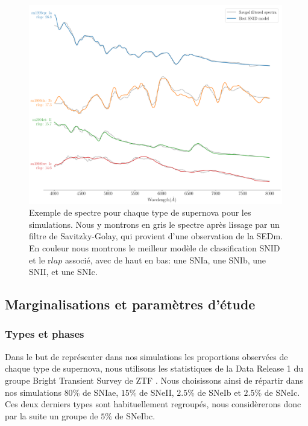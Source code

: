 \documentclass[../main/main.tex]{subfiles}
\begin{document}
\begin{figure}[ht]
  \centering
  \includegraphics[width=0.99\textwidth]{../figures/08_simu/specsimueach.pdf}
  \caption[Exemple de spectre pour chaque type de supernova pour les
  simulations.]{Exemple de spectre pour chaque type de supernova pour
    les simulations. Nous y montrons en gris le spectre après
    lissage par un filtre de Savitzky-Golay, qui provient d'une
    observation de la SEDm. En couleur nous montrons le meilleur
  modèle de classification SNID et le r$lap$ associé, avec de haut en bas: une SNIa, une
  SNIb, une SNII, et une SNIc.}
  \label{fig:specsimueach}
\end{figure}

\subsection{Marginalisations et paramètres d'étude}

\subsubsection{Types et phases}

Dans le but de représenter dans nos simulations les proportions
observées de chaque
type de supernova, nous utilisons les statistiques de la Data
Release 1 du groupe Bright Transient Survey de ZTF
\citep[BTS;][]{FremlingZTFspec2020}.
Nous choisissons ainsi de répartir dans nos simulations $80\%$ de SNIae,
$15\%$ de SNeII, $2.5\%$ de SNeIb et $2.5\%$ de SNeIc. Ces deux derniers
types sont habituellement regroupés, nous considèrerons donc par la
suite un groupe de $5\%$ de SNeIbc.
\end{document}
